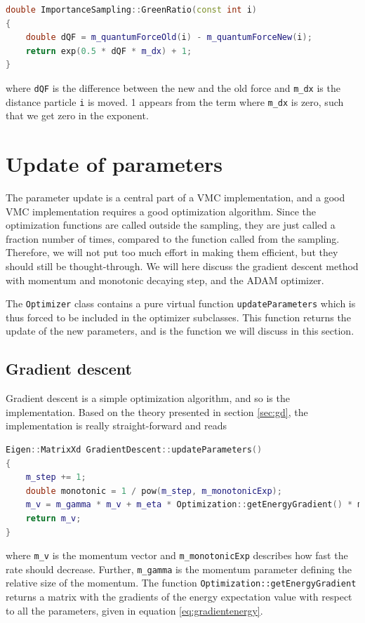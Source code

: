 \begin{lstlisting}[language=c++,caption={Taken from \lstinline{importancesampling.cpp}.}]
double ImportanceSampling::GreenRatio(const int i)
{
	double dQF = m_quantumForceOld(i) - m_quantumForceNew(i);
	return exp(0.5 * dQF * m_dx) + 1;
}
\end{lstlisting}
where \lstinline|dQF| is the difference between the new and the old force and \lstinline|m_dx| is the distance particle \lstinline|i| is moved. 1 appears from the term where \lstinline|m_dx| is zero, such that we get zero in the exponent. 

\section{Update of parameters} \label{sec:update}
The parameter update is a central part of a VMC implementation, and a good VMC implementation requires a good optimization algorithm. Since the optimization functions are called outside the sampling, they are just called a fraction number of times, compared to the function called from the sampling. Therefore, we will not put too much effort in making them efficient, but they should still be thought-through. We will here discuss the gradient descent method with momentum and monotonic decaying step, and the ADAM optimizer. 

The \lstinline|Optimizer| class contains a pure virtual function \lstinline|updateParameters| which is thus forced to be included in the optimizer subclasses. This function returns the update of the new parameters, and is the function we will discuss in this section.

\subsection{Gradient descent}
Gradient descent is a simple optimization algorithm, and so is the implementation. Based on the theory presented in section \ref{sec:gd}, the implementation is really straight-forward and reads
\begin{lstlisting}[language=c++,caption={Taken from \lstinline{gradientdescent.cpp}.}]
Eigen::MatrixXd GradientDescent::updateParameters()
{
	m_step += 1;
	double monotonic = 1 / pow(m_step, m_monotonicExp);
	m_v = m_gamma * m_v + m_eta * Optimization::getEnergyGradient() * monotonic;
	return m_v;
}
\end{lstlisting}
where \lstinline|m_v| is the momentum vector and \lstinline|m_monotonicExp| describes how fast the rate should decrease. Further, \lstinline|m_gamma| is the momentum parameter defining the relative size of the momentum. The function \lstinline|Optimization::getEnergyGradient| returns a matrix with the gradients of the energy expectation value with respect to all the parameters, given in equation \eqref{eq:gradientenergy}.

